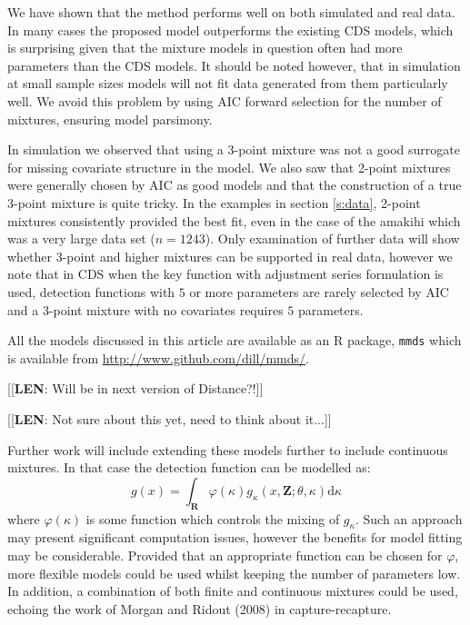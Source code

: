 \documentclass[useAMS,referee, usegraphicx]{biom}
\begin{document}
We have shown that the method performs well on both simulated and real data. In many cases the proposed model outperforms the existing CDS models, which is surprising given that the mixture models in question often had more parameters than the CDS models. It should be noted however, that in simulation at small sample sizes models will not fit data generated from them particularly well. We avoid this problem by using AIC forward selection for the number of mixtures, ensuring model parsimony.

In simulation we observed that using a 3-point mixture was not a good surrogate for missing covariate structure in the model. We also saw that 2-point mixtures were generally chosen by AIC as good models and that the construction of a true 3-point mixture is quite tricky. In the examples in section \ref{s:data}, 2-point mixtures consistently provided the best fit, even in the case of the amakihi which was a very large data set ($n=1243$). Only examination of further data will show whether 3-point and higher mixtures can be supported in real data, however we note that in CDS when the key function with adjustment series formulation is used, detection functions with $5$ or more parameters are rarely selected by AIC and a 3-point mixture with no covariates requires $5$ parameters.

All the models discussed in this article are available as an \textsf{R} package, \texttt{mmds} which is available from \url{http://www.github.com/dill/mmds/}.

[[\textbf{LEN}: Will be in next version of Distance?!]]

[[\textbf{LEN}: Not sure about this yet, need to think about it...]]

Further work will include extending these models further to include continuous mixtures. In that case the detection function can be modelled as:
\begin{equation*}
g(x) = \int_\mathbf{R} \varphi(\kappa) g_\kappa(x,\mathbf{Z}; \theta, \kappa) \text{d}\kappa
\end{equation*}
where $\varphi(\kappa)$ is some function which controls the mixing of $g_\kappa$. Such an approach may present significant computation issues, however the benefits for model fitting may be considerable. Provided that an appropriate function can be chosen for $\varphi$, more flexible models could be used whilst keeping the number of parameters low. In addition, a combination of both finite and continuous mixtures could be used, echoing the work of Morgan and Ridout (2008) in capture-recapture.
\end{document}
